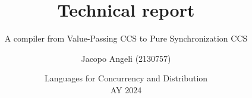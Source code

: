 \newcommand{\VCCS}{\textsc{Vccs}}
\newcommand{\PCCS}{\textsc{Pccs}}
\newcommand{\CCS}{\textsc{Ccs}}

\title{Technical report}
\subtitle{A compiler from Value-Passing CCS to Pure Synchronization CCS}
\author{Jacopo Angeli (2130757)}
\date{Languages for Concurrency and Distribution \\ AY 2024}
